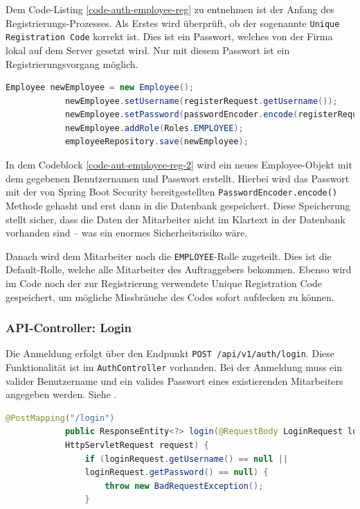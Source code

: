 		Dem Code-Listing \ref{code-auth-employee-reg} zu entnehmen ist der Anfang des Registrierungs-Prozesses. Als Erstes wird überprüft, ob der sogenannte \texttt{Unique Registration Code} korrekt ist. Dies ist ein Passwort, welches von der Firma lokal auf dem Server gesetzt wird. Nur mit diesem Passwort ist ein Registrierungsvorgang möglich.
		
		\begin{lstlisting}[caption={Erstellung eines neuen Mitarbeiter-Accounts.}, label={code-aut-employee-reg-2}, language=Java]
			Employee newEmployee = new Employee();
			newEmployee.setUsername(registerRequest.getUsername());
			newEmployee.setPassword(passwordEncoder.encode(registerRequest.getPassword()));
			newEmployee.addRole(Roles.EMPLOYEE);
			employeeRepository.save(newEmployee);
		\end{lstlisting}
		
		In dem Codeblock \ref{code-aut-employee-reg-2} wird ein neues Employee-Objekt mit dem gegebenen Benutzernamen und Passwort erstellt. Hierbei wird das Passwort mit der von Spring Boot Security bereitgestellten \texttt{PasswordEncoder.encode()} Methode gehasht und erst dann in die Datenbank gespeichert. Diese Speicherung stellt sicher, dass die Daten der Mitarbeiter nicht im Klartext in der Datenbank vorhanden sind – was ein enormes Sicherheitsrisiko wäre.
		
		Danach wird dem Mitarbeiter noch die \texttt{EMPLOYEE}-Rolle zugeteilt. Dies ist die Default-Rolle, welche alle Mitarbeiter des Auftraggebers bekommen. Ebenso wird im Code noch der zur Registrierung verwendete Unique Registration Code gespeichert, um mögliche Missbräuche des Codes sofort aufdecken zu können.
		
		\subsubsection{API-Controller: Login}
		
		Die Anmeldung erfolgt über den Endpunkt \texttt{POST /api/v1/auth/login}. Diese Funktionalität ist im \texttt{AuthController} vorhanden. Bei der Anmeldung muss ein valider Benutzername und ein valides Passwort eines existierenden Mitarbeiters angegeben werden. Siehe \cite{prompt-gpt-authentication-implementation}.
		
		\begin{lstlisting}[caption={Validierung der Benutzereingaben beim Login.}, label={code-auth-login-req}, language=Java]
			@PostMapping("/login")
			public ResponseEntity<?> login(@RequestBody LoginRequest loginRequest,
			HttpServletRequest request) {
				if (loginRequest.getUsername() == null || 
				loginRequest.getPassword() == null) {
					throw new BadRequestException();
				}
			\end{lstlisting}
			
